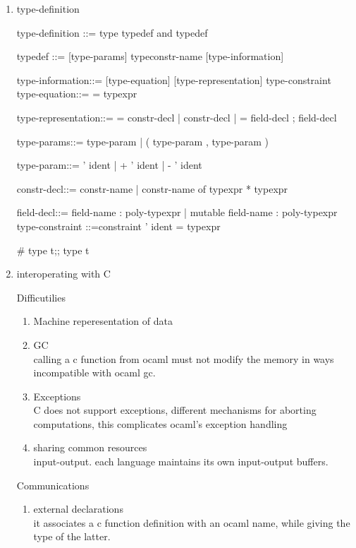 \begin{enumerate}
  \item type-definition

\begin{bluecode}

type-definition	::= type typedef  { and typedef }  
 
typedef	::= [type-params]  typeconstr-name  [type-information]  
 
type-information::=
  [type-equation] [type-representation]{ type-constraint }  
type-equation::= = typexpr  
 
type-representation::=
          = constr-decl  { | constr-decl }  
 	| = { field-decl  { ; field-decl } }  

type-params::=	type-param  
 	| ( type-param  { , type-param } )  
 
type-param::=	' ident  
 	| + ' ident  
 	| - ' ident  
 
constr-decl::=	constr-name  
 	| constr-name of  typexpr  { * typexpr }  
 
field-decl::=	field-name :  poly-typexpr  
 	| mutable field-name :  poly-typexpr  
type-constraint	::=constraint ' ident =  typexpr
\end{bluecode}

\begin{alternate}
# type t;;
type t
\end{alternate}

\item  interoperating with C

  Difficutilies 
  \begin{enumerate}
  \item Machine reperesentation of data
  \item GC \\
    calling a c function from ocaml must not modify the memory in ways incompatible
    with ocaml gc.
  \item Exceptions \\
    C does not support exceptions, different mechanisms for aborting computations,
    this complicates ocaml's exception handling
  \item sharing common resources \\
    input-output. each language maintains its own input-output buffers.
  \end{enumerate}

  Communications
  \begin{enumerate}
  \item external declarations \\
    it associates a c function definition with an ocaml name, while giving the
    type of the latter.


\end{enumerate}
\end{enumerate}
